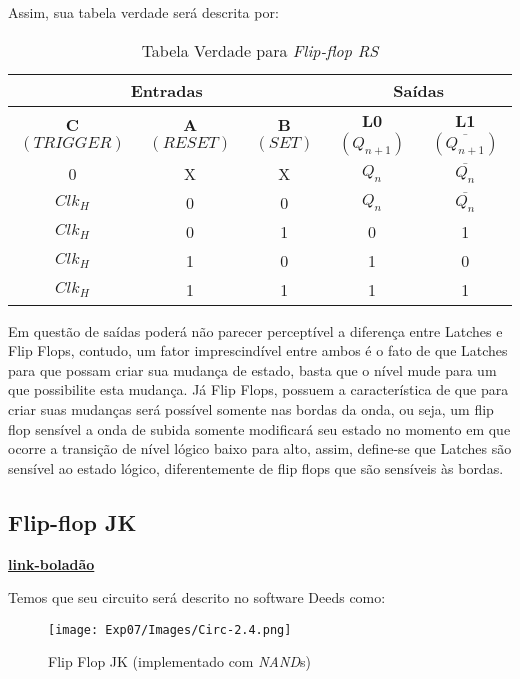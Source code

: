 \documentclass[12pt]{article}
\begin{document}
Assim, sua tabela verdade será descrita por:
\begin{table}[H]
    \centering
    \caption{Tabela Verdade para \emph{Flip-flop RS}}
    \begin{tabular}{|c|c|c||c|c|}\hline
      \multicolumn{3}{|c||}{Entradas} & \multicolumn{2}{|c|}{Saídas} \\\hline
      \textbf{C $({TRIGGER})$} & \textbf{A $({RESET})$} & \textbf{B $({SET})$} & \textbf{L0 $(Q_{n+1})$} & \textbf{L1 $(\overline{Q_{n+1}})$} \\\hline
      0 & X & X & $Q_{n}$ & $\overline{Q_{n}}$ \\\hline
      $Clk_H$ & 0 & 0 & $Q_{n}$ & $\overline{Q_{n}}$\\\hline
      $Clk_H$ & 0 & 1 & 0 & 1\\\hline
      $Clk_H$ & 1 & 0 & 1 & 0 \\\hline
      $Clk_H$ & 1 & 1 & 1 & 1 \\\hline
    \end{tabular}\label{tab:truth_table_flipflop_rs}
\end{table}

Em questão de saídas poderá não parecer perceptível a diferença entre Latches e
Flip Flops, contudo, um fator imprescindível entre ambos é o fato de que Latches
para que possam criar sua mudança de estado, basta que o nível mude para um que
possibilite esta mudança. Já Flip Flops, possuem a característica de que
para criar suas mudanças será possível somente nas bordas da onda, ou seja, um
flip flop sensível a onda de subida somente modificará seu estado no momento em
que ocorre a transição de nível lógico baixo para alto, assim, define-se que
Latches são sensível ao estado lógico, diferentemente de flip flops que são
sensíveis às bordas.

\subsection{Flip-flop JK}\label{sec:2.4}

\href{link-boladão}{\textbf{link-boladão}}

Temos que seu circuito será descrito no software Deeds como:

\begin{figure}[H]
  \centering
  \texttt{[image: Exp07/Images/Circ-2.4.png]}
  \caption{Flip Flop JK (implementado com \emph{NAND}s)}\label{fig:flip-flop-jk.png}
\end{figure}
\end{document}
